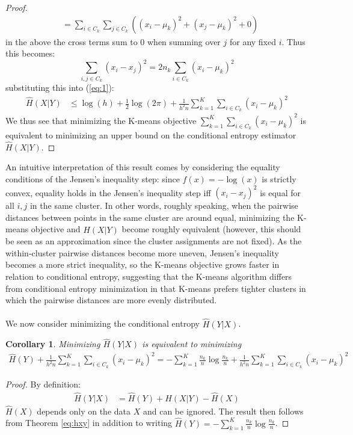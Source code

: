 \documentclass{article} %
\newtheorem{corollary}{Corollary}
\begin{document}
\begin{proof}
\begin{align*}
&= \sum_{i \in C_k} \sum_{j \in C_k} ((x_i - \mu_k)^2 + (x_j - \mu_k)^2 + 0)
\end{align*}
in the above the cross terms sum to $0$ when summing over $j$ for any fixed $i$. Thus this becomes:
\[ \sum_{i,j \in C_k} (x_i - x_j)^2 = 2n_k \sum_{i \in C_k} (x_i - \mu_k)^2 \]
substituting this into (\ref{eq:1}):
\begin{align*}
\hat{H}(X|Y) &\le  \log(h) + \frac{1}{2}\log(2 \pi) + \frac{1}{h^2 n} \sum_{k=1}^K \sum_{i \in C_k} (x_i - \mu_k)^2
\end{align*}
We thus see that minimizing the K-means objective $\sum_{k=1}^K \sum_{i \in C_k} (x_i - \mu_k)^2$ is equivalent to minimizing an upper bound on the conditional entropy estimator $\hat{H}(X|Y)$.
\end{proof}

An intuitive interpretation of this result comes by considering the equality conditions of the Jensen's inequality step: since $f(x) = -\log(x)$ is strictly convex, equality holds in the Jensen's inequality step iff $(x_i-x_j)^2$ is equal for all $i,j$ in the same cluster. In other words, roughly speaking, when the pairwise distances between points in the same cluster are around equal, minimizing the K-means objective and $\hat{H}(X|Y)$ become roughly equivalent (however, this should be seen as an approximation since the cluster assignments are not fixed). As the within-cluster pairwise distances become more uneven, Jensen's inequality becomes a more strict inequality, so the K-means objective grows faster in relation to conditional entropy, suggesting that the K-means algorithm differs from conditional entropy minimization in that K-means prefers tighter clusters in which the pairwise distances are more evenly distributed. \\\\
We now consider minimizing the conditional entropy $\hat{H}(Y|X)$.
\begin{corollary}
Minimizing $\hat{H}(Y|X)$ is equivalent to minimizing
\begin{align*}
\hat{H}(Y) + \frac{1}{h^2 n} \sum_{k=1}^K \sum_{i \in C_k} (x_i - \mu_k)^2 = -\sum_{k=1}^K \frac{n_k}{n} \log \frac{n_k}{n} + \frac{1}{h^2 n} \sum_{k=1}^K \sum_{i \in C_k} (x_i - \mu_k)^2
\end{align*}
\end{corollary}
\begin{proof}
By definition:
\begin{align*}
\hat{H}(Y|X) &= \hat{H}(Y) + \hat{H}(X|Y) - \hat{H}(X)
\end{align*}
$\hat{H}(X)$ depends only on the data $X$ and can be ignored. The result then
follows from Theorem \ref{eq:hxy} in addition to writing $\hat{H}(Y) = -\sum_{k=1}^K \frac{n_k}{n} \log \frac{n_k}{n}$.

\end{proof}
\end{document}
